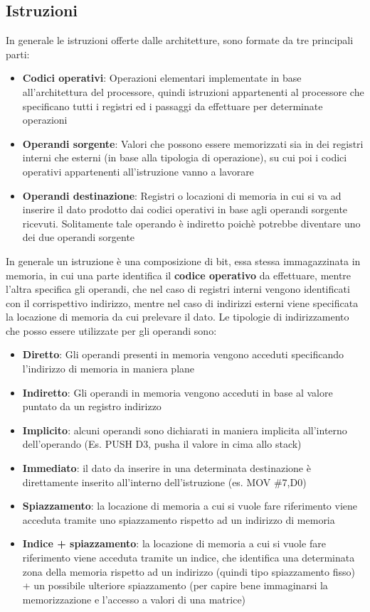 \subsection{Istruzioni}\label{par:istruzioni}
In generale le istruzioni offerte dalle architetture, sono formate da tre principali parti:
\begin{itemize}
    \item \textbf{Codici operativi}: Operazioni elementari implementate in base all'architettura del processore, quindi istruzioni appartenenti al processore che specificano tutti i registri ed i passaggi da effettuare per determinate operazioni

    \item \textbf{Operandi sorgente}: Valori che possono essere memorizzati sia in dei registri interni che esterni (in base alla tipologia di operazione), su cui poi i codici operativi appartenenti all'istruzione vanno a lavorare

    \item \textbf{Operandi destinazione}: Registri o locazioni di memoria in cui si va ad inserire il dato prodotto dai codici operativi in base agli operandi sorgente ricevuti. Solitamente tale operando è indiretto poichè potrebbe diventare uno dei due operandi sorgente
\end{itemize}

In generale un istruzione è una composizione di bit, essa stessa immagazzinata in memoria, in cui una parte identifica il \textbf{codice operativo} da effettuare, mentre l'altra specifica gli operandi, che nel caso di registri interni vengono identificati con il corrispettivo indirizzo, mentre nel caso di indirizzi esterni viene specificata la locazione di memoria da cui prelevare il dato. Le tipologie di indirizzamento che posso essere utilizzate per gli operandi sono:
\begin{itemize}
    \item \textbf{Diretto}: Gli operandi presenti in memoria vengono acceduti specificando l'indirizzo di memoria in maniera plane
    \item \textbf{Indiretto}: Gli operandi in memoria vengono acceduti in base al valore puntato da un registro indirizzo
    \item \textbf{Implicito}: alcuni operandi sono dichiarati in maniera implicita all'interno dell'operando (Es. PUSH D3, pusha il valore in cima allo stack)
    \item \textbf{Immediato}: il dato da inserire in una determinata destinazione è direttamente inserito all'interno dell'istruzione (es. MOV \#7,D0)
    \item \textbf{Spiazzamento}: la locazione di memoria a cui si vuole fare riferimento viene acceduta tramite uno spiazzamento rispetto ad un indirizzo di memoria
    \item \textbf{Indice + spiazzamento}: la locazione di memoria a cui si vuole fare riferimento viene acceduta tramite un indice, che identifica una determinata zona della memoria rispetto ad un indirizzo (quindi tipo spiazzamento fisso) + un possibile ulteriore spiazzamento (per capire bene immaginarsi la memorizzazione e l'accesso a valori di una matrice)
\end{itemize}

